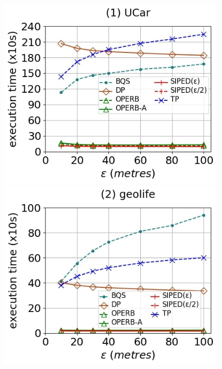 {\begin{figure}[tb!]
	\centering
	\includegraphics[scale=0.250]{Figures/Exp-PED-time-epsilon-service.jpg}	\hspace{0.5ex}
	\includegraphics[scale=0.250]{Figures/Exp-PED-time-epsilon-geolife.jpg}	\hspace{0.5ex}

\end{figure}}

